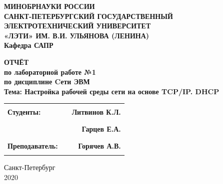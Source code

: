 \documentclass[a4paper,12pt]{article}
\begin{document}
\thispagestyle{empty} %

\begin{centering}
\textbf{
{\large МИНОБРНАУКИ РОССИИ\\
САНКТ-ПЕТЕРБУРГСКИЙ ГОСУДАРСТВЕННЫЙ\\
ЭЛЕКТРОТЕХНИЧЕСКИЙ УНИВЕРСИТЕТ\\
«ЛЭТИ» ИМ. В.И. УЛЬЯНОВА (ЛЕНИНА)\\
Кафедра САПР}\\
}
\end{centering}


\vspace{7cm}

\begin{centering}
\textbf{{\large 
ОТЧЁТ\\
по лабораторной работе №1\\
по дисциплине \guillemotleft Cети ЭВМ\guillemotright\\
Тема: \guillemotleft Настройка рабочей среды сети на основе TCP/IP.
DHCP\guillemotright\\
}}
\end{centering}

\vspace{4cm}

\begin{tabular}{l c r}
    \textbf{{\large Студенты:}}& \rule{4cm}{1pt} & \textbf{{\large Литвинов К.Л.}}\\
    \textbf{}& \rule{4cm}{1pt} &\textbf{{\large Гарцев Е.А.}}\\
    \textbf{{\large Преподаватель:}}& \hspace{2cm} \rule{4cm}{1pt} \hspace{2cm} & \textbf{{\large Горячев А.В.}}\\
\end{tabular}

\vspace{6cm}


\begin{centering}
	{\large
Санкт-Петербург \\
2020 \\
}
\end{centering}

\newpage
\end{document}
